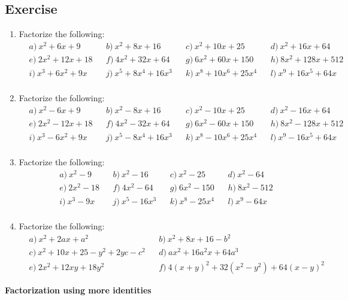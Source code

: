 \documentclass[12pt]{article}
\begin{document}
    \subsection*{Exercise}
    \begin{enumerate}
        \item Factorize the following:\begin{align*}
            &a)\ x^2+6x+9&&b)\ x^2+8x+16&&c)\ x^2+10x+25&&d)\ x^2+16x+64\\
            &e)\ 2x^2+12x+18&&f)\ 4x^2+32x+64&&g)\ 6x^2+60x+150&&h)\ 8x^2+128x+512\\
            &i)\ x^3+6x^2+9x&&j)\ x^5+8x^4+16x^3&&k)\ x^8+10x^6+25x^4&&l)\ x^9+16x^5+64x\\
        \end{align*}
        \item Factorize the following:\begin{align*}
            &a)\ x^2-6x+9&&b)\ x^2-8x+16&&c)\ x^2-10x+25&&d)\ x^2-16x+64\\
            &e)\ 2x^2-12x+18&&f)\ 4x^2-32x+64&&g)\ 6x^2-60x+150&&h)\ 8x^2-128x+512\\
            &i)\ x^3-6x^2+9x&&j)\ x^5-8x^4+16x^3&&k)\ x^8-10x^6+25x^4&&l)\ x^9-16x^5+64x\\
        \end{align*}
        \item Factorize the following:\begin{align*}
            &a)\ x^2-9&&b)\ x^2-16&&c)\ x^2-25&&d)\ x^2-64\\
            &e)\ 2x^2-18&&f)\ 4x^2-64&&g)\ 6x^2-150&&h)\ 8x^2-512\\
            &i)\ x^3-9x&&j)\ x^5-16x^3&&k)\ x^8-25x^4&&l)\ x^9-64x\\
        \end{align*}
        \item Factorize the following:\begin{align*}
            &a)\ x^2+2ax+a^2&&b)\ x^2+8x+16-b^2\\
            &c)\ x^2+10x+25-y^2+2yc-c^2&&d)\ ax^2+16a^2x+64a^3\\
            &e)\ 2x^2+12xy+18y^2&&f)\ 4(x+y)^2+32(x^2-y^2)+64(x-y)^2
        \end{align*}
    \end{enumerate}

    \begin{center}
        \textbf{Factorization using more identities}
    \end{center}
\end{document}
